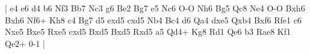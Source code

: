 \makegametitle 
|
 e4 e6 d4 b6 Nf3 Bb7 Nc3 g6 Be2 Bg7 e5 Nc6 O-O Nh6 Bg5 Qc8 Ne4 O-O Bxh6 Bxh6
  Nf6+ Kh8 c4 Bg7 d5 exd5 cxd5 Nb4 Bc4 d6 Qa4 dxe5 Qxb4 Bxf6 Rfe1 c6 Nxe5 Bxe5 Rxe5 cxd5
  Bxd5 Bxd5 Rxd5 a5 Qd4+ Kg8 Rd1 Qe6 b3 Rae8 Kf1 Qe2+ 0-1
 |
